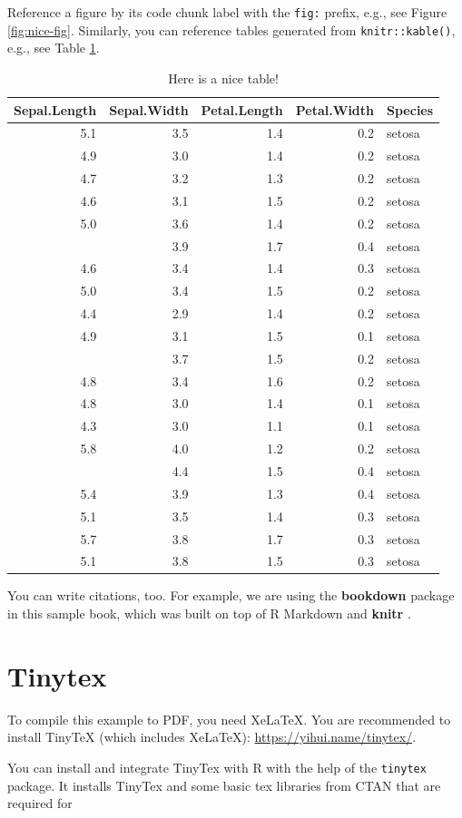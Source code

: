 \documentclass[
  fontsize=13pt,
  english,
  a4paper,
  openany, a4paper, oneside]{book}
\begin{document}
Reference a figure by its code chunk label with the \texttt{fig:} prefix, e.g., see Figure \ref{fig:nice-fig}. Similarly, you can reference tables generated from \texttt{knitr::kable()}, e.g., see Table \ref{tab:nicetab}.

\begin{table}

\caption{\label{tab:nicetab}Here is a nice table!}
\centering
\begin{tabular}[t]{rrrrl}
\toprule
Sepal.Length & Sepal.Width & Petal.Length & Petal.Width & Species\\
\midrule
5.1 & 3.5 & 1.4 & 0.2 & setosa\\
4.9 & 3.0 & 1.4 & 0.2 & setosa\\
4.7 & 3.2 & 1.3 & 0.2 & setosa\\
4.6 & 3.1 & 1.5 & 0.2 & setosa\\
5.0 & 3.6 & 1.4 & 0.2 & setosa\\
\addlinespace
5.4 & 3.9 & 1.7 & 0.4 & setosa\\
4.6 & 3.4 & 1.4 & 0.3 & setosa\\
5.0 & 3.4 & 1.5 & 0.2 & setosa\\
4.4 & 2.9 & 1.4 & 0.2 & setosa\\
4.9 & 3.1 & 1.5 & 0.1 & setosa\\
\addlinespace
5.4 & 3.7 & 1.5 & 0.2 & setosa\\
4.8 & 3.4 & 1.6 & 0.2 & setosa\\
4.8 & 3.0 & 1.4 & 0.1 & setosa\\
4.3 & 3.0 & 1.1 & 0.1 & setosa\\
5.8 & 4.0 & 1.2 & 0.2 & setosa\\
\addlinespace
5.7 & 4.4 & 1.5 & 0.4 & setosa\\
5.4 & 3.9 & 1.3 & 0.4 & setosa\\
5.1 & 3.5 & 1.4 & 0.3 & setosa\\
5.7 & 3.8 & 1.7 & 0.3 & setosa\\
5.1 & 3.8 & 1.5 & 0.3 & setosa\\
\bottomrule
\end{tabular}
\end{table}

You can write citations, too. For example, we are using the \textbf{bookdown} package \citep{R-bookdown} in this sample book, which was built on top of R Markdown and \textbf{knitr} \citep{xie2015}.

\hypertarget{tinytex}{%
\section{Tinytex}\label{tinytex}}

To compile this example to PDF, you need XeLaTeX. You are recommended to install TinyTeX (which includes XeLaTeX): \url{https://yihui.name/tinytex/}.

You can install and integrate TinyTex with R with the help of the \texttt{tinytex} package. It installs TinyTex and some basic tex libraries from CTAN that are required for

  
\end{document}
